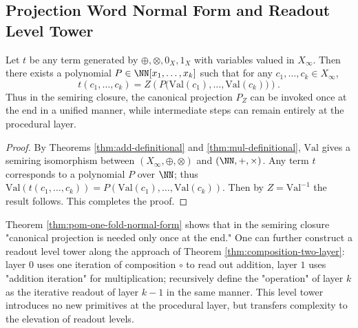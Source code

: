 \subsection{Projection Word Normal Form and Readout Level Tower}\label{subsec:pom-normal-form}
\begin{theorem}\label{thm:pom-one-fold-normal-form}
Let $t$ be any term generated by $\oplus,\otimes,0_X,1_X$ with variables valued in $X_\infty$. Then there exists a polynomial
\(
P\in\NN[x_1,\dots,x_k]
\)
such that for any $c_1,\dots,c_k\in X_\infty$,
\[
t(c_1,\dots,c_k)=Z\!\left(P\bigl(\mathrm{Val}(c_1),\dots,\mathrm{Val}(c_k)\bigr)\right).
\]
Thus in the semiring closure, the canonical projection $P_Z$ can be invoked once at the end in a unified manner, while intermediate steps can remain entirely at the procedural layer.
\end{theorem}
\begin{proof}
By Theorems \ref{thm:add-definitional} and \ref{thm:mul-definitional}, $\mathrm{Val}$ gives a semiring isomorphism between $(X_\infty,\oplus,\otimes)$ and $(\NN,+,\times)$. Any term $t$ corresponds to a polynomial $P$ over $\NN$; thus
\(
\mathrm{Val}(t(c_1,\dots,c_k))=P(\mathrm{Val}(c_1),\dots,\mathrm{Val}(c_k))
\).
Then by $Z=\mathrm{Val}^{-1}$ the result follows. This completes the proof.
\end{proof}
\begin{remark}\label{rem:pom-hyper-iteration}
Theorem \ref{thm:pom-one-fold-normal-form} shows that in the semiring closure "canonical projection is needed only once at the end." One can further construct a readout level tower along the approach of Theorem \ref{thm:composition-two-layer}: layer $0$ uses one iteration of composition $\circ$ to read out addition, layer $1$ uses "addition iteration" for multiplication; recursively define the "operation" of layer $k$ as the iterative readout of layer $k{-}1$ in the same manner. This level tower introduces no new primitives at the procedural layer, but transfers complexity to the elevation of readout levels.
\end{remark}


